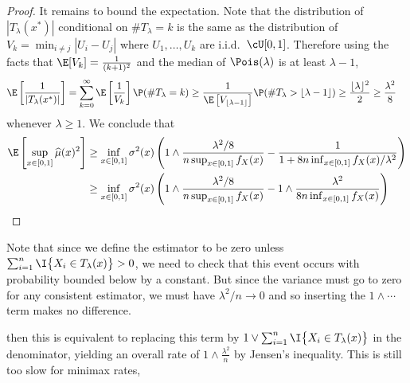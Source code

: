 \documentclass{article}
\begin{document}
\begin{proof}
  \pagebreak



  It remains to bound the expectation.
  Note that the distribution of
  $|T_\lambda(x^*)|$ conditional on $\# T_\lambda = k$ is
  the same as the distribution of
  $V_k = \min_{i \neq j} |U_i - U_j|$ where
  $U_1, \ldots, U_k$ are i.i.d.\ $\cU[0,1]$.
  Therefore using the facts that
  $\E[V_k] = \frac{1}{(k+1)^2}$
  \cite{pinelis2019order}
  and the median of $\Pois(\lambda)$ is at least $\lambda - 1$,
  \begin{align*}
    \E\left[
    \frac{1} {|T_\lambda(x^*)|}
    \right]
    &=
      \sum_{k=0}^\infty
      \E\left[
      \frac{1}{V_k}
      \right]
      \P(\# T_\lambda = k)
      \geq
      \frac{1}{\E\left[V_{\lfloor\lambda - 1 \rfloor} \right]}
      \P(\# T_\lambda > \lfloor \lambda - 1 \rfloor)
      \geq
      \frac{\lfloor \lambda \rfloor^2}{2}
      \geq
      \frac{\lambda^2}{8}
  \end{align*}
  whenever $\lambda \geq 1$.
  We conclude that
\begin{align*}
    \E\left[
    \sup_{x \in [0,1]}
    \widehat\mu(x)^2
    \right]
    &\geq
      \inf_{x \in [0,1]} \sigma^2(x)
      \left(
      1 \wedge
      \frac{\lambda^2 / 8}
      {n \sup_{x \in [0,1]} f_X(x)}
      - \frac{1}
      {1 + 8n \inf_{x \in [0,1]} f_X(x) / \lambda^2}
      \right) \\
    &\geq
      \inf_{x \in [0,1]} \sigma^2(x)
      \left(
      1 \wedge
      \frac{\lambda^2 / 8}
      {n \sup_{x \in [0,1]} f_X(x)}
      - 1 \wedge
      \frac{\lambda^2}
      {8n \inf_{x \in [0,1]} f_X(x)}
      \right) \\
  \end{align*}
\end{proof}
%
Note that since we define the estimator to be zero unless
$\sum_{i=1}^n \I\big\{ X_i \in T_\lambda(x) \big\} > 0$,
we need to check that this event occurs with probability
bounded below by a constant.
But since the variance must go to zero for any consistent estimator,
we must have $\lambda^2/n \to 0$ and so
inserting the $1 \wedge \cdots$ term makes no difference.




then this is equivalent to replacing this term by
$1 \vee \sum_{i=1}^n \I\big\{ X_i \in T_\lambda(x) \big\}$
in the denominator,
yielding an overall rate of
$1 \wedge \frac{\lambda^2}{n}$ by Jensen's inequality.
This is still too slow for minimax rates,





\printbibliography
\end{document}
